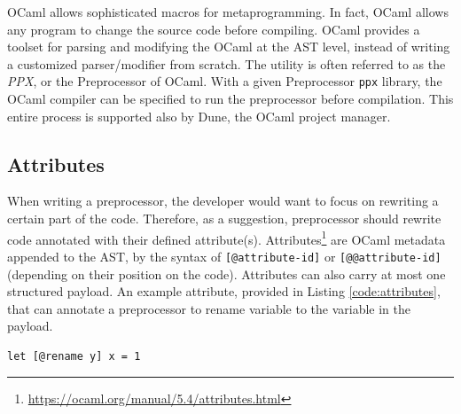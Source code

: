 OCaml allows sophisticated macros for metaprogramming. In fact, OCaml allows any program to change the source code before compiling. OCaml provides a toolset for parsing and modifying the OCaml at the AST level, instead of writing a customized parser/modifier from scratch. The utility is often referred to as the \textit{PPX}, or the Preprocessor of OCaml. With a given Preprocessor \texttt{ppx} library, the OCaml compiler can be specified to run the preprocessor before compilation. This entire process is supported also by Dune, the OCaml project manager.

\subsection{Attributes}

When writing a preprocessor, the developer would want to focus on rewriting a certain part of the code. Therefore, as a suggestion, preprocessor should rewrite code annotated with their defined attribute(s). Attributes\footnote{\href{https://ocaml.org/manual/5.4/attributes.html}{https://ocaml.org/manual/5.4/attributes.html}} are OCaml metadata appended to the AST, by the syntax of \texttt{[@attribute-id]} or \texttt{[@@attribute-id]} (depending on their position on the code). Attributes can also carry at most one structured payload. An example attribute, provided in Listing \ref{code:attributes}, that can annotate a preprocessor to rename variable to the variable in the payload.

\begin{listing}
\begin{verbatim}
let [@rename y] x = 1
\end{verbatim}
\caption{Example attribute}
\label{code:attributes}
\end{listing}
